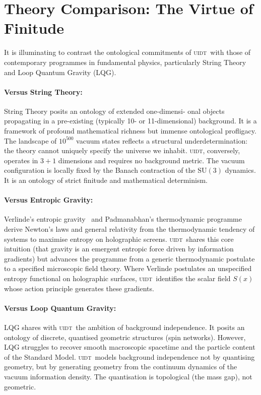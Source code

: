 \documentclass[12pt,a4paper,twoside]{article}
\theoremstyle{plain}
\theoremstyle{definition}
\theoremstyle{remark}
\newcommand{\UIDT}{\textsc{uidt}}
\newcommand{\Sx}{S(x)}
\begin{document}
\newpage

\section{Theory Comparison: The Virtue of Finitude}
\label{sec:comparison}

It is illuminating to contrast the ontological commitments of \UIDT\ with those
of contemporary programmes in fundamental physics, particularly String Theory
and Loop Quantum Gravity (LQG).
\vspace{-0.3em}
\paragraph{Versus String Theory:}
String Theory posits an ontology of extended one-dimensi-
onal objects propagating in a pre-existing (typically 10- or 11-dimensional) background. It is a framework of profound mathematical richness but immense ontological profligacy. The landscape of $10^{500}$ vacuum states reflects a structural underdetermination: the theory cannot uniquely specify the universe we inhabit. \UIDT, conversely, operates in $3+1$ dimensions and requires no background metric. The vacuum configuration is locally fixed by the Banach contraction of the $\mathrm{SU}(3)$ dynamics. It is an ontology of strict finitude and mathematical determinism.
\vspace{-0.9em}
\paragraph{Versus Entropic Gravity:}
Verlinde's entropic gravity~\cite{Verlinde2011} and Padmanabhan's thermodynamic
programme~\cite{Padmanabhan2010} derive Newton's laws and general relativity from the thermodynamic tendency of systems to maximise entropy on holographic screens. \UIDT\ shares this core intuition (that gravity is an emergent entropic force driven by information gradients) but advances the programme from a generic thermodynamic postulate to a specified microscopic field theory. Where Verlinde postulates an unspecified entropy functional on holographic surfaces, \UIDT\ identifies the scalar field $\Sx$ whose action principle generates these gradients.
\vspace{-0.9em}
\paragraph{Versus Loop Quantum Gravity:}
LQG shares with \UIDT\ the ambition of background independence. It posits an
ontology of discrete, quantised geometric structures (spin networks). However,
LQG struggles to recover smooth macroscopic spacetime and the particle content
of the Standard Model. \UIDT\ models background independence not by
quantising geometry, but by generating geometry from the continuum dynamics of
the vacuum information density. The quantisation is topological (the mass
gap), not geometric.
\vspace{-0.9em}
\end{document}

